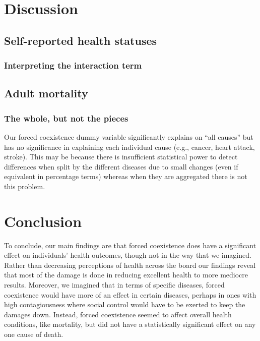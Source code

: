 \documentclass[12pt]{article}
\begin{document}
\section{Discussion}
\subsection{Self-reported health statuses}
\subsubsection{Interpreting the interaction term}

\subsection{Adult mortality}
\subsubsection{The whole, but not the pieces}
Our forced coexistence dummy variable significantly explains on ``all causes'' but has no significance in explaining each individual cause (e.g., cancer, heart attack, stroke). This may be because there is insufficient statistical power to detect differences when split by the different diseases due to small changes (even if equivalent in percentage terms) whereas when they are aggregated there is not this problem. 

\section{Conclusion}
To conclude, our main findings are that forced coexistence does have a significant effect on individuals’ health outcomes, though not in the way that we imagined.  Rather than decreasing perceptions of health across the board our findings reveal that most of the damage is done in reducing excellent health to more mediocre results.  Moreover, we imagined that in terms of specific diseases, forced coexistence would have more of an effect in certain diseases, perhaps in ones with high contagiousness where social control would have to be exerted to keep the damages down.  Instead, forced coexistence seemed to affect overall health conditions, like mortality, but did not have a statistically significant effect on any one cause of death.
\end{document}
